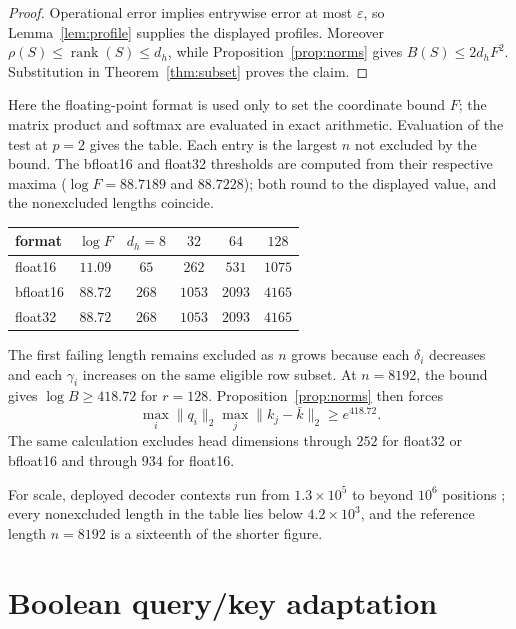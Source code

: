 \documentclass[10pt]{article} %
\theoremstyle{definition}
\DeclareMathOperator{\rank}{rank}
\begin{document}
\begin{proof}
Operational error implies entrywise error at most \(\varepsilon\), so
Lemma~\ref{lem:profile} supplies the displayed profiles.  Moreover
\(\rho(S)\le\rank(S)\le d_h\), while Proposition~\ref{prop:norms} gives
\(B(S)\le2d_hF^2\).  Substitution in Theorem~\ref{thm:subset} proves the
claim.
\end{proof}

Here the floating-point format is used only to set the coordinate bound \(F\);
the matrix product and softmax are evaluated in exact arithmetic.
Evaluation of the test at \(p=2\) gives the table.  Each entry is
the largest \(n\) not excluded by the bound.  The bfloat16 and float32
thresholds are computed from their respective maxima (\(\log F=88.7189\) and
\(88.7228\)); both round to the displayed value, and the nonexcluded lengths
coincide.

\begin{center}
\begin{tabular}{lccccc}
\toprule
format & \(\log F\) & \(d_h=8\) & \(32\) & \(64\) & \(128\) \\
\midrule
float16          & \(11.09\) & \(65\)  & \(262\)  & \(531\)  & \(1075\) \\
bfloat16         & \(88.72\) & \(268\) & \(1053\) & \(2093\) & \(4165\) \\
float32          & \(88.72\) & \(268\) & \(1053\) & \(2093\) & \(4165\) \\
\bottomrule
\end{tabular}
\end{center}

The first failing length remains excluded as \(n\) grows because each
\(\delta_i\) decreases and each \(\gamma_i\) increases on the same eligible
row subset.  At \(n=8192\), the bound gives \(\log B\ge418.72\)
for \(r=128\).  Proposition~\ref{prop:norms} then forces
\[
 \max_i\|q_i\|_2\max_j\|k_j-\bar k\|_2\ge e^{418.72}.
\]
The same calculation excludes head dimensions through \(252\) for
float32 or bfloat16 and through \(934\) for float16.

For scale, deployed decoder contexts run from \(1.3\times10^{5}\) to beyond
\(10^{6}\) positions \citep{llama3herd,gemini15}; every nonexcluded length in
the table lies below \(4.2\times10^{3}\), and the reference length \(n=8192\)
is a sixteenth of the shorter figure.

\section{Boolean query/key adaptation}\label{sec:adaptive}
\end{document}

